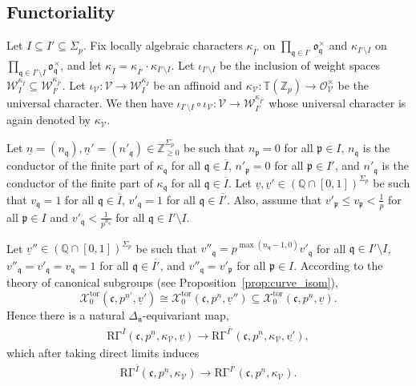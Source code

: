\documentclass[11pt]{amsart}
\theoremstyle{definition} %
\theoremstyle{plain} %
\theoremstyle{remark} %
\newcommand{\QQ}{{\mathbb Q}}
\newcommand{\TT}{{\mathbb T}}
\newcommand{\ZZ}{{\mathbb Z}}
\newcommand{\cO}{{\mathcal O}}
\newcommand{\cV}{{\mathcal V}}
\newcommand{\cW}{{\mathcal W}}
\newcommand{\cX}{{\mathcal X}}
\newcommand{\frakc}{\mathfrak c}
\newcommand{\frakn}{\mathfrak n}
\newcommand{\frako}{\mathfrak o}
\newcommand{\frakp}{\mathfrak p}
\newcommand{\frakq}{\mathfrak q}
\newcommand{\isom}{\cong} %
\newcommand{\tor}{\mathrm{tor}} %
\newcommand{\RG}{\mathrm{R\Gamma}}
\begin{document}
\subsection{Functoriality}
Let $I\subseteq I' \subseteq \Sigma_p$.
Fix locally algebraic characters $\kappa_{\overline{I'}}$ on $\prod_{\frakq \in \overline{I'} } \frako_{\frakq}^\times$ and $\kappa_{I'\setminus I}$ on $\prod_{\frakq\in I'\setminus I} \frako_{\frakq}^\times$, and let $\kappa_{\overline{I}} = \kappa_{\overline{I'}}\cdot \kappa_{I'\setminus I}$.
Let $\iota_{I'\setminus I}$ be the inclusion of weight spaces $\cW_{I}^{\kappa_{\overline{I}}} \subseteq \cW_{I'}^{\kappa_{\overline{I'}}}$.
Let $\iota_\cV \colon \cV\rightarrow \cW_{I}^{\kappa_{\overline{I}}}$ be an affinoid and $\kappa_{\cV}\colon \TT(\ZZ_p) \rightarrow \cO_{\cV}^\times$ be the universal character.
We then have $\iota_{I'\setminus I}\circ \iota_\cV\colon \cV \rightarrow \cW_{I'}^{\kappa_{\overline{I'}}}$ whose universal character is again denoted by $\kappa_\cV$.

Let $\underline{n} = (n_\frakq), \underline{n}' = (n'_\frakq)\in \ZZ_{\geqslant 0}^{\Sigma_p}$ be such that $n_\frakp=0$ for all $\frakp\in I$, $n_\frakq$ is the conductor of the finite part of $\kappa_\frakq$ for all $\frakq\in\overline{I}$, $n'_\frakp=0$ for all $\frakp\in I'$, and $n'_\frakq$ is the conductor of the finite part of $\kappa_\frakq$ for all $\frakq\in\overline{I}$.
Let $\underline{v},\underline{v}'\in(\QQ\cap[0,1])^{\Sigma_p}$ be such that $v_\frakq = 1$ for all $\frakq\in\overline{I}$, $v'_\frakq = 1$ for all $\frakq\in\overline{I'}$.
Also, assume that $v'_\frakp \leqslant v_\frakp<\frac{1}{p}$ for all $\frakp\in I$ and $v'_\frakq <\frac1{p^{n_\frakq}}$ for all $\frakq\in I'\setminus I$.

Let $\underline{v}'' \in (\QQ\cap [0,1])^{\Sigma_p}$ be such that $v''_\frakq = p^{\max(n_\frakq-1,0)}v'_\frakq$ for all $\frakq\in I'\setminus I$, $v''_\frakq = v'_\frakq = v_\frakq = 1$ for all $\frakq \in \overline{I'}$, and $v''_\frakq = v'_\frakp$ for all $\frakp\in I$.
According to the theory of canonical subgroups (see Proposition~\ref{prop:curve_isom}),  
\[
\cX_0^\tor(\frakc,p^{\underline{n}'},\underline{v}') \isom \cX_0^\tor(\frakc,p^{\underline{n}},\underline{v}'')
\subseteq \cX_0^\tor(\frakc,p^{\underline{n}},\underline{v}).
\]
Hence there is a natural $\Delta_\frakn$-equivariant map,
\begin{align*} 
\RG^{\overline{I}}(\frakc,p^{\underline{n}},\kappa_\cV,\underline{v}) \rightarrow \RG^{\overline{I'}}(\frakc,p^{\underline{n}},\kappa_\cV,\underline{v'}),
\end{align*}
which after taking direct limits induces
\begin{align} \label{eq:functoriality}
\RG^{\overline{I}}(\frakc,p^{\underline{n}},\kappa_\cV) \rightarrow \RG^{\overline{I'}}(\frakc,p^{\underline{n}},\kappa_\cV).
\end{align}
\end{document}
